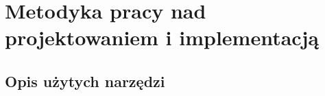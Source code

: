\documentclass[a4paper,twoside,12pt]{book}
\begin{document}
%
%
%
%
%        



\chapter{Metodyka pracy nad projektowaniem i implementacją}
\label{ch:Metodyka}

\section{Opis użytych narzędzi}
\end{document}
